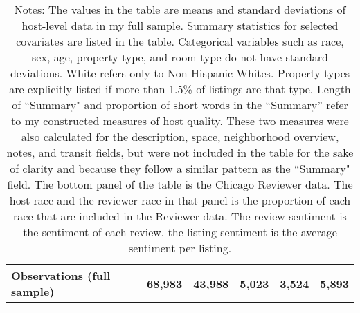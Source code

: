 {\begin{longtable}{l*{5}{c}}
\hline
Observations (full sample)     & 68,983   &       43,988         &       5,023         &       3,524         &       5,893         \\
\hline\hline
\caption*{Notes: The values in the table are means and standard deviations of host-level data in my full sample. Summary statistics for selected covariates are listed in the table. Categorical variables such as race, sex, age, property type, and room type do not have standard deviations. White refers only to Non-Hispanic Whites. Property types are explicitly listed if more than 1.5\% of listings are that type. Length of ``Summary" and proportion of short words in the ``Summary'' refer to my constructed measures of host quality. These two measures were also calculated for the description, space, neighborhood overview, notes, and transit fields, but were not included in the table for the sake of clarity and because they follow a similar pattern as the ``Summary" field. The bottom panel of the table is the Chicago Reviewer data. The host race and the reviewer race in that panel is the proportion of each race that are included in the Reviewer data. The review sentiment is the sentiment of each review, the listing sentiment is the average sentiment per listing.}

\end{longtable}
}







